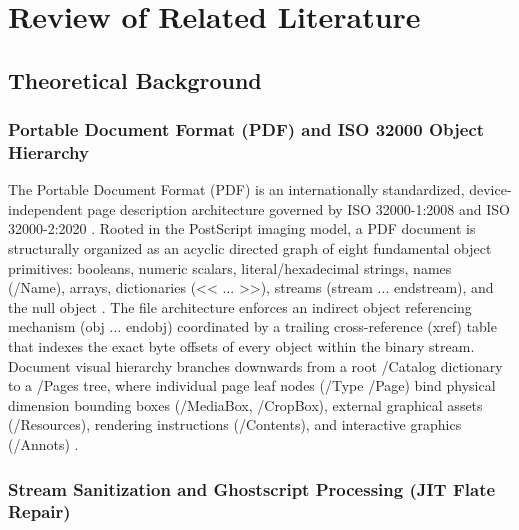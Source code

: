 \chapter{Review of Related Literature}
\label{ch:lit_review}

\section{Theoretical Background}

\subsection{Portable Document Format (PDF) and ISO 32000 Object Hierarchy}

The Portable Document Format (PDF) is an internationally standardized, device-independent page description architecture governed by ISO 32000-1:2008 and ISO 32000-2:2020 \cite{ref12, ref13}.
Rooted in the PostScript imaging model, a PDF document is structurally organized as an acyclic directed graph of eight fundamental object primitives: booleans, numeric scalars, literal/hexadecimal strings, names (/Name), arrays, dictionaries (\textless\textless{} ... \textgreater\textgreater{}), streams (stream ... endstream), and the null object \cite{ref12}.
The file architecture enforces an indirect object referencing mechanism (obj ... endobj) coordinated by a trailing cross-reference (xref) table that indexes the exact byte offsets of every object within the binary stream.
Document visual hierarchy branches downwards from a root /Catalog dictionary to a /Pages tree, where individual page leaf nodes (/Type /Page) bind physical dimension bounding boxes (/MediaBox, /CropBox), external graphical assets (/Resources), rendering instructions (/Contents), and interactive graphics (/Annots) \cite{ref12, ref13}.

\subsection{Stream Sanitization and Ghostscript Processing (JIT Flate Repair)}

